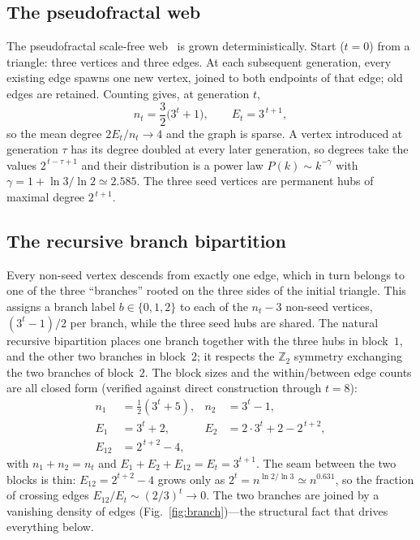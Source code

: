 \documentclass[aps,pre,twocolumn,superscriptaddress,floatfix,nofootinbib]{revtex4-2}
\begin{document}
\subsection{The pseudofractal web}
\label{sec:web}

The pseudofractal scale-free web~\cite{dorogovtsev2002pseudofractal} is grown
deterministically. Start ($t=0$) from a triangle: three vertices and three
edges. At each subsequent generation, every existing edge spawns one new vertex,
joined to both endpoints of that edge; old edges are retained. Counting gives,
at generation $t$,
\begin{equation}
n_t=\frac{3}{2}\bigl(3^{t}+1\bigr),\qquad
E_t=3^{\,t+1},
\label{eq:NE}
\end{equation}
so the mean degree $2E_t/n_t\to 4$ and the graph is sparse. A vertex introduced
at generation $\tau$ has its degree doubled at every later generation, so
degrees take the values $2^{\,t-\tau+1}$ and their distribution is a power law
$P(k)\sim k^{-\gamma}$ with $\gamma=1+\ln 3/\ln 2\simeq 2.585$. The three seed
vertices are permanent hubs of maximal degree $2^{\,t+1}$.

\subsection{The recursive branch bipartition}
\label{sec:branch}

Every non-seed vertex descends from exactly one edge, which in turn belongs to
one of the three ``branches'' rooted on the three sides of the initial triangle.
This assigns a branch label $b\in\{0,1,2\}$ to each of the $n_t-3$ non-seed
vertices, $(3^{t}-1)/2$ per branch, while the three seed hubs are shared. The
natural recursive bipartition places one branch together with the three hubs in
block~$1$, and the other two branches in block~$2$; it respects the
$\mathbb{Z}_2$ symmetry exchanging the two branches of block~$2$. 
The block sizes and the within/between edge counts are
all closed form (verified against direct construction through $t=8$):
\begin{align}
n_1&=\tfrac{1}{2}\!\left(3^{t}+5\right), & n_2&=3^{t}-1,\label{eq:sizes}\\
E_1&=3^{t}+2, & E_2&=2\cdot 3^{t}+2-2^{\,t+2},\label{eq:within}\\
E_{12}&=2^{\,t+2}-4, & &\label{eq:between}
\end{align}
with $n_1+n_2=n_t$ and $E_1+E_2+E_{12}=E_t=3^{t+1}$. The seam between the two
blocks is thin: $E_{12}=2^{t+2}-4$ grows only as $2^{t}=n^{\ln 2/\ln 3}\simeq
n^{0.631}$, so the fraction of crossing edges $E_{12}/E_t\sim(2/3)^{t}\to 0$.
The two branches are joined by a vanishing density of edges
(Fig.~\ref{fig:branch})---the structural fact that drives everything below.
\end{document}
